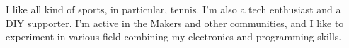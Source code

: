 \documentclass[english,a4paper]{europasscv}
\begin{document}
\begin{europasscv}
		 {
			I like all kind of sports, in particular, tennis. I'm also a tech
			enthusiast and a DIY supporter. I'm active in the Makers and other
			communities, and  I like to experiment in various field combining
			my electronics and programming skills.
		}


	\end{europasscv}
\end{document}
